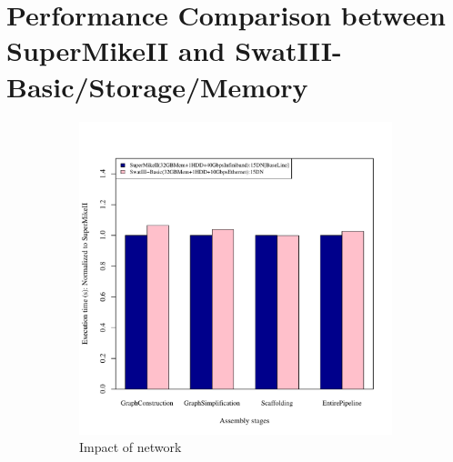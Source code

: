 \documentclass[conference]{IEEEtran}
\begin{document}
\section {Performance Comparison between SuperMikeII and SwatIII-Basic/Storage/Memory} \label{IndividualHWEffect}
\begin{figure}[h]
	\begin{subfigure}[b]{0.23\textwidth}
                \includegraphics[width=\textwidth]{Figure/PerormanceData/Plots/Network.pdf}
                \caption{Impact of network}
                \label{fig:SuperMikeSwatBasic}
        \end{subfigure}
 	\begin{subfigure}[b]{0.23\textwidth}

\end{subfigure}
\end{figure}
\end{document}
